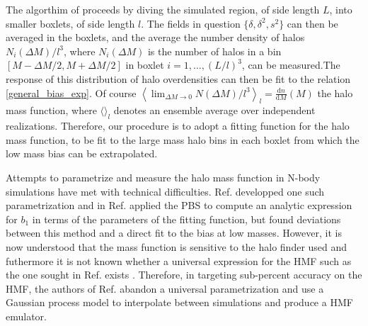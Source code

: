 The algorthim of \citeauthor{modietal2017} proceeds by diving the simulated region, of side length $L$, into smaller boxlets, of side length $l$. The fields in question $\{\delta, \delta^2, s^2\}$ can then be averaged in the boxlets, and the average the number density of halos $N_i(\Delta M)/l^3$, where $N_i(\Delta M)$ is the number of halos in a bin $[M - \Delta M/2, M + \Delta M/2]$ in boxlet $i = 1, \dots, (L/l)^3$, can be measured.The response of this distribution of halo overdensities can then be fit to the relation \ref{general_bias_exp}. Of course $\left\langle \lim_{\Delta M \rightarrow 0} N(\Delta M)/l^3 \right\rangle_l = \frac{\mathrm{d}n}{\mathrm{d}M}(M)$ the halo mass function, where $\langle \rangle_l$ denotes an ensemble average over independent realizations. Therefore, our procedure is to adopt a fitting function for the halo mass function, to be fit to the large mass halo bins in each boxlet from which the low mass bias can be extrapolated.

Attempts to parametrize and measure the halo mass function in N-body simulations have met with technical difficulties. Ref. \citep{tinker2008} developped one such parametrization and in Ref. \citep{tinker2010} applied the PBS to compute an analytic expression for $b_1$ in terms of the parameters of the fitting function, but found deviations between this method and a direct fit to the bias at low masses. However, it is now understood that the mass function is sensitive to the halo finder used and futhermore it is not known whether a universal expression for the HMF such as the one sought in Ref. \citep{tinker2008} exists \citep{desjacquesetal2018}. Therefore, in targeting sub-percent accuracy on the HMF, the authors of Ref. \citep{aemulushmf} abandon a universal parametrization and use a Gaussian process model to interpolate between simulations and produce a HMF emulator.

